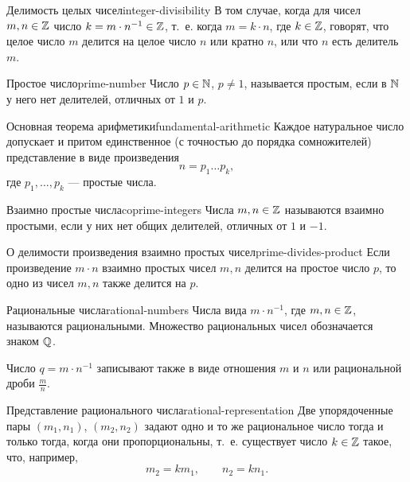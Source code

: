 \begin{definition}{Делимость целых чисел}{integer-divisibility}
  В том случае, когда для чисел $m,n\in\mathbb{Z}$ число $k=m\cdot n^{-1}\in\mathbb{Z}$,
  т.~е. когда $m=k\cdot n$, где $k\in\mathbb{Z}$, говорят, что целое число $m$
  делится на целое число $n$ или кратно $n$, или что $n$ есть делитель $m$.
\end{definition}

\begin{definition}{Простое число}{prime-number}
  Число $p\in\mathbb{N}$, $p\ne1$, называется простым, если в $\mathbb{N}$ у него нет
  делителей, отличных от $1$ и $p$.
\end{definition}

\begin{theorem}{Основная теорема арифметики}{fundamental-arithmetic}
  Каждое натуральное число допускает и притом единственное (с точностью до
  порядка сомножителей) представление в виде произведения
  \[
    n=p_1\ldots p_k,
  \]
  где $p_1,\ldots,p_k$ — простые числа.
\end{theorem}

\begin{definition}{Взаимно простые числа}{coprime-integers}
  Числа $m,n\in\mathbb{Z}$ называются взаимно простыми, если у них нет общих
  делителей, отличных от $1$ и $-1$.
\end{definition}

\begin{corollary}{О делимости произведения взаимно простых чисел}{prime-divides-product}
  Если произведение $m\cdot n$ взаимно простых чисел $m,n$ делится на
  простое число $p$, то одно из чисел $m,n$ также делится на $p$.
\end{corollary}

\begin{definition}{Рациональные числа}{rational-numbers}
  Числа вида $m\cdot n^{-1}$, где $m,n\in\mathbb{Z}$, называются рациональными.
  Множество рациональных чисел обозначается знаком $\mathbb{Q}$.

  Число $q=m\cdot n^{-1}$ записывают также в виде отношения $m$ и $n$ или
  рациональной дроби $\frac{m}{n}$.
\end{definition}

\begin{properties}{Представление рационального числа}{rational-representation}
  Две упорядоченные пары $(m_1,n_1)$, $(m_2,n_2)$ задают одно и то же
  рациональное число тогда и только тогда, когда они пропорциональны,
  т.~е. существует число $k\in\mathbb{Z}$ такое, что, например,
  \[
    m_2=km_1,\qquad n_2=kn_1.
  \]
\end{properties}

